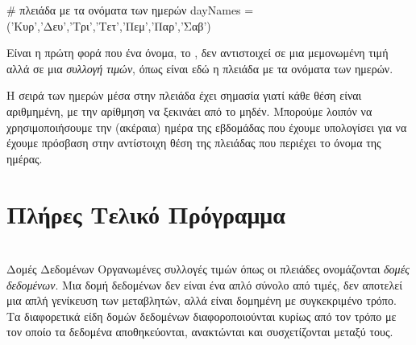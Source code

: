 \documentclass[a4paper,11pt,oneside]{book}
\begin{document}
\begin{pycode}
# πλειάδα με τα ονόματα των ημερών
dayNames = ('Κυρ','Δευ','Τρι','Τετ','Πεμ','Παρ','Σαβ')
\end{pycode}

Είναι η πρώτη φορά που ένα όνομα, το , δεν αντιστοιχεί σε μια μεμονωμένη τιμή αλλά σε μια \emph{συλλογή τιμών}, όπως είναι εδώ η πλειάδα με τα ονόματα των ημερών. 

Η σειρά των ημερών μέσα στην πλειάδα έχει σημασία γιατί κάθε θέση είναι αριθμημένη, με την αρίθμηση να ξεκινάει από το μηδέν. Μπορούμε λοιπόν να χρησιμοποιήσουμε την (ακέραια) ημέρα της εβδομάδας που έχουμε υπολογίσει για να έχουμε πρόσβαση στην αντίστοιχη θέση της πλειάδας που περιέχει το όνομα της ημέρας.



\section{Πλήρες Τελικό Πρόγραμμα}

\tobecontinued




\section*{}
\vspace{-4\parskip}
\hrulefill

\begin{theory}{Δομές Δεδομένων}
Οργανωμένες συλλογές τιμών όπως οι πλειάδες ονομάζονται \emph{δομές δεδομένων}. Μια δομή δεδομένων δεν είναι ένα απλό σύνολο από τιμές, δεν αποτελεί μια απλή γενίκευση των μεταβλητών, αλλά είναι δομημένη με συγκεκριμένο τρόπο. Τα διαφορετικά είδη δομών δεδομένων διαφοροποιούνται κυρίως από τον τρόπο με τον οποίο τα δεδομένα αποθηκεύονται, ανακτώνται και συσχετίζονται μεταξύ τους. 
\end{theory}

\hrulefill
\end{document}
